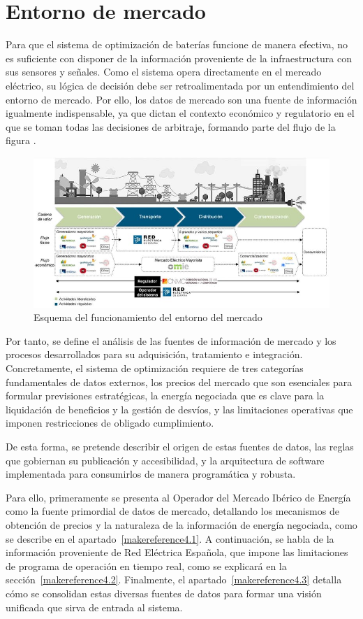 \cleardoublepage

\chapter{Entorno de mercado}
\label{makereference4}

Para que el sistema de optimización de baterías funcione de manera efectiva, no es suficiente con disponer de la información proveniente de la infraestructura con sus sensores y señales. Como el sistema opera directamente en el mercado eléctrico, su lógica de decisión debe ser retroalimentada por un entendimiento del entorno de mercado. Por ello, los datos de mercado son una fuente de información igualmente indispensable, ya que dictan el contexto económico y regulatorio en el que se toman todas las decisiones de arbitraje, formando parte del flujo de la figura .

\begin{figure}
\centering
\includegraphics[width=0.5\linewidth]{figures/esquema-mercado.jpg}
\caption{Esquema del funcionamiento del entorno del mercado}
\label{fig:esquema-mercado}
\end{figure}

Por tanto, se define el análisis de las fuentes de información de mercado y los procesos desarrollados para su adquisición, tratamiento e integración. Concretamente, el sistema de optimización requiere de tres categorías fundamentales de datos externos, los precios del mercado que son esenciales para formular previsiones estratégicas, la energía negociada que es clave para la liquidación de beneficios y la gestión de desvíos, y las limitaciones operativas que imponen restricciones de obligado cumplimiento.

De esta forma, se pretende describir el origen de estas fuentes de datos, las reglas que gobiernan su publicación y accesibilidad, y la arquitectura de software implementada para consumirlos de manera programática y robusta.

Para ello, primeramente se presenta al Operador del Mercado Ibérico de Energía como la fuente primordial de datos de mercado, detallando los mecanismos de obtención de precios y la naturaleza de la información de energía negociada, como se describe en el apartado~\ref{makereference4.1}. A continuación, se habla de la información proveniente de Red Eléctrica Española, que impone las limitaciones de programa de operación en tiempo real, como se explicará en la sección~\ref{makereference4.2}. Finalmente, el apartado~\ref{makereference4.3} detalla cómo se consolidan estas diversas fuentes de datos para formar una visión unificada que sirva de entrada al sistema.

